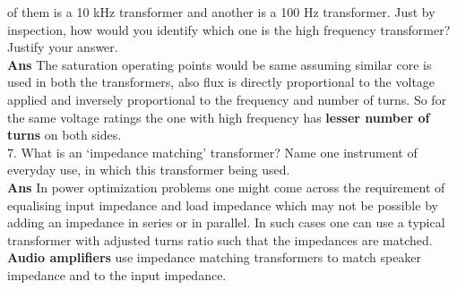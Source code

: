 \documentclass[12pt]{article}
\begin{document}
    of them is a 10 kHz transformer and another is a 100 Hz transformer. Just by inspection, how
    would you identify which one is the high frequency transformer? Justify your answer.
    \vspace{0.1cm} \\
    \textbf{Ans} The saturation operating points would be same assuming similar core is used in both the transformers, also flux is directly proportional to the voltage applied and inversely proportional to the frequency and number of turns. So for the same voltage ratings the one with high frequency has \textbf{lesser number of turns} on both sides.\vspace{0.2cm}\\
    7. What is an `impedance matching' transformer? Name one instrument of everyday use, in which
    this transformer being used.
    \vspace{0.1cm} \\
    \textbf{Ans} In power optimization problems one might come across the requirement of equalising input impedance and load impedance which may not be possible by adding an impedance in series or in parallel. In such cases one can use a typical transformer with adjusted turns ratio such that the impedances are matched. \\
    \textbf{Audio amplifiers} use impedance matching transformers to match speaker impedance and to the input impedance.
\end{document}
